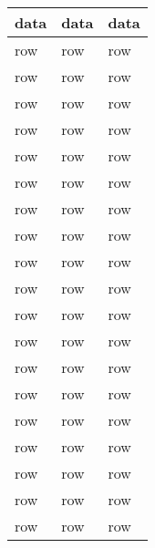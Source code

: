 \inputminted[breaklines=true, framesep=10pt, fontsize=\footnotesize, firstline=1]{python}{listing/code_sample.py}


\begin{longtable}{ 
    | m{10em}
    | m{10em} 
    | m{10em} | }
    
    \hline
    data & data & data\\
    \hline
    row & row & row\\
    \hline   
    row & row & row\\
    \hline   
    row & row & row\\
    \hline   
    row & row & row\\
    \hline   
    row & row & row\\
    \hline   
    row & row & row\\
    \hline   
    row & row & row\\
    \hline   
    row & row & row\\
    \hline   
    row & row & row\\
    \hline   
    row & row & row\\
    \hline   
    row & row & row\\
    \hline   
    row & row & row\\
    \hline   
    row & row & row\\
    \hline   
    row & row & row\\
    \hline   
    row & row & row\\
    \hline   
    row & row & row\\
    \hline   
    row & row & row\\
    \hline   
    row & row & row\\
    \hline   
    row & row & row\\
    \hline   
\end{longtable}